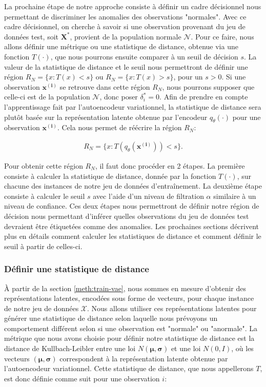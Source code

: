 La prochaine étape de notre approche consiste à définir un cadre décisionnel nous permettant de discriminer les anomalies des observations "normales". Avec ce cadre décisionnel, on cherche à savoir si une observation provenant du jeu de données test, soit $\boldsymbol{X}^{*}$, provient de la population normale $\mathcal{N}$. Pour ce faire, nous allons définir une métrique ou une statistique de distance, obtenue via une fonction $T(\cdot)$, que nous pourrons ensuite comparer à un seuil de décision $s$. La valeur de la statistique de distance et le seuil nous permettront de définir une région $R_{N}=\{x :T(x)<s\}$ ou $R_{N}=\{x :T(x)>s\}$, pour un $s>0$. Si une observation $\boldsymbol{x^{(i)}}$ se retrouve dans cette région $R_{N}$, nous pourrons supposer que celle-ci est de la population $\mathcal{N}$, donc poser $\delta^{*}_{i}=0$. Afin de prendre en compte l'apprentissage fait par l'autoencodeur variationnel, la statistique de distance sera plutôt basée sur la représentation latente obtenue par l'encodeur $q_\theta(\cdot)$ pour une observation $\boldsymbol{x^{(i)}}$. Cela nous permet de réécrire la région $R_N$:

\begin{gather}  \label{eq:region}
R_{N}=\{x :T(q_\theta(\boldsymbol{x^{(i)}}))<s\}.
\end{gather}

Pour obtenir cette région $R_N$, il faut donc procéder en 2 étapes. La première consiste à calculer la statistique de distance, donnée par la fonction $T(\cdot)$, sur chacune des instances de notre jeu de données d'entraînement. La deuxième étape consiste à calculer le seuil $s$ avec l'aide d'un niveau de filtration $\alpha$ similaire à un niveau de confiance. Ces deux étapes nous permettront de définir notre région de décision nous permettant d'inférer quelles observations du jeu de données test devraient être étiquetées comme des anomalies. Les prochaines sections décrivent plus en détails comment calculer les statistiques de distance et comment définir le seuil à partir de celles-ci.

\subsubsection{Définir une statistique de distance}

 À partir de la section \ref{meth:train-vae}, nous sommes en mesure d'obtenir des représentations latentes, encodées sous forme de vecteurs, pour chaque instance de notre jeu de données $\mathcal{X}$. Nous allons utiliser ces représentations latentes pour générer une statistique de distance selon laquelle nous prévoyons un comportement différent selon si une observation est "normale" ou "anormale". La métrique que nous avons choisie pour définir notre statistique de distance est la distance de Kullbach-Leibler entre une loi $N(\boldsymbol{\mu}, \boldsymbol{\sigma})$ et une loi $N(0,I)$, où les vecteurs $(\boldsymbol{\mu}, \boldsymbol{\sigma})$ correspondent à la représentation latente obtenue par l'autoencodeur variationnel. Cette statistique de distance, que nous appellerons $T$, est donc définie comme suit pour une observation $i$:
 
